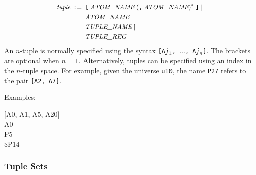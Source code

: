 \documentclass[a4paper,12pt]{article}
\begin{document}
$$\small\begin{aligned}
\textit{tuple} \,::=\,{}
    & \verb|[|\; \textit{ATOM\_NAME}\; (\verb|,|\; \textit{ATOM\_NAME})^*\; \verb|]| \mid {} \\
    & \textit{ATOM\_NAME} \mid {} \\
    & \textit{TUPLE\_NAME} \mid {} \\
    & \textit{TUPLE\_REG}
\end{aligned}$$
%
An $n$-tuple is normally specified using the syntax \texttt{[A\textit{j}$_1$,
$\ldots$, A\textit{j}$_n$]}. The brackets are optional when $n = 1$.
Alternatively, tuples can be specified using an index in the $n$-tuple space.
For example, given the universe \verb|u10|, the name \verb|P27| refers to the
pair \verb|[A2, A7]|.

Examples:

\pre
\ttfamily\small
[A0, A1, A5, A20] \\
A0 \\
P5 \\
\$P14
\post

\subsubsection{Tuple Sets}
\label{tuple-sets}
\end{document}
